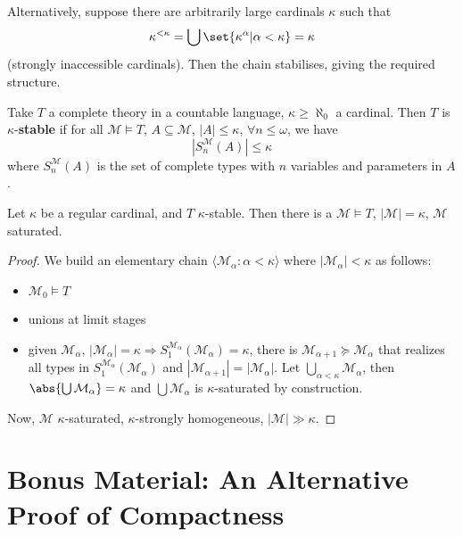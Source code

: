 \documentclass{article}
\makeatletter
\let\models\vDash
\newcommand{\bonusnamed}[1]{\textbf{#1}\index{#1@*#1}}
\newcommand{\M}{\mathcal{M}}
\makeatother
\begin{document}
Alternatively, suppose there are arbitrarily large cardinals $\kappa$ such that
\begin{align*}
  \kappa^{< \kappa} = \bigcup \set{\kappa^\alpha | \alpha < \kappa} = \kappa
\end{align*}
(strongly inaccessible cardinals).
Then the chain stabilises, giving the required structure. %
\begin{defi}
  Take $T$ a complete theory in a countable language, $\kappa \geq \aleph_0$ a cardinal.
  Then $T$ is $\kappa$-\bonusnamed{stable} if for all $\mathcal{M} \models T$, $A \subseteq \mathcal{M}$, $|A| \leq \kappa$, $\forall n \leq \omega$,
  we have
  \begin{equation*}
    |S_n^\mathcal{M}(A)| \leq \kappa
  \end{equation*}
  where $S_n^\mathcal{M}(A)$ is the set of complete types with $n$ variables and parameters in $A$.
\end{defi}
\begin{thm}
  Let $\kappa$ be a regular cardinal, and $T$ $\kappa$-stable. Then there is a $\mathcal{M} \models T$, $|\mathcal{M}| = \kappa$, $\M$ saturated.
\end{thm}
\begin{proof}
  We build an elementary chain $\langle \M_\alpha : \alpha < \kappa \rangle$ where $|\M_\alpha| < \kappa$ as follows:
  \begin{itemize}
    \item $\M_0 \models T$
    \item unions at limit stages
    \item given $\M_\alpha$, $|\M_\alpha|=\kappa \Rightarrow S^{\M_\alpha}_1(\M_\alpha) = \kappa$,
      there is $\M_{\alpha+1} \succcurlyeq \M_\alpha$ that realizes all types in $S_1^{\M_\alpha}(\M_\alpha)$ and $|\M_{\alpha+1}| = |\M_\alpha|$.
      Let $\bigcup_{\alpha < \kappa} \M_\alpha$, then $\abs{\bigcup \M_\alpha} = \kappa$ and $\bigcup \M_\alpha$ is $\kappa$-saturated by construction.
  \end{itemize}
  Now, $\mathcal{M}$ $\kappa$-saturated, $\kappa$-strongly homogeneous, $|\M| \gg \kappa$.
\end{proof}

\clearpage
\section{Bonus Material: An Alternative Proof of Compactness}
\label{sec:bonuscompact}
\end{document}
